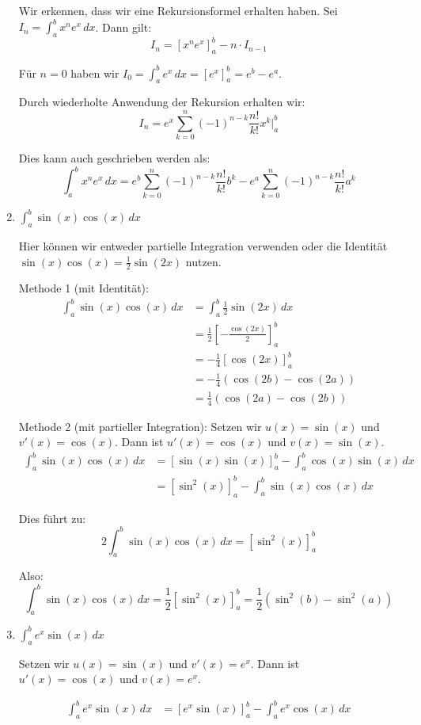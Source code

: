 \documentclass{article}
\begin{document}
\begin{enumerate}[label=(\alph*)]
Wir erkennen, dass wir eine Rekursionsformel erhalten haben. Sei $I_n = \int_a^b x^n e^x\,dx$. Dann gilt:
$$I_n = [x^n e^x]_a^b - n \cdot I_{n-1}$$

Für $n = 0$ haben wir $I_0 = \int_a^b e^x\,dx = [e^x]_a^b = e^b - e^a$.

Durch wiederholte Anwendung der Rekursion erhalten wir:
$$I_n = e^x \sum_{k=0}^{n} (-1)^{n-k} \frac{n!}{k!} x^k \Bigg|_a^b$$

Dies kann auch geschrieben werden als:
$$\int_a^b x^n e^x\,dx = e^b \sum_{k=0}^{n} (-1)^{n-k} \frac{n!}{k!} b^k - e^a \sum_{k=0}^{n} (-1)^{n-k} \frac{n!}{k!} a^k$$

\item $\int_a^b \sin(x)\cos(x)\,dx$

Hier können wir entweder partielle Integration verwenden oder die Identität $\sin(x)\cos(x) = \frac{1}{2}\sin(2x)$ nutzen.

Methode 1 (mit Identität):
\begin{align}
\int_a^b \sin(x)\cos(x)\,dx &= \int_a^b \frac{1}{2}\sin(2x)\,dx\\
&= \frac{1}{2} \left[-\frac{\cos(2x)}{2}\right]_a^b\\
&= -\frac{1}{4}[\cos(2x)]_a^b\\
&= -\frac{1}{4}(\cos(2b) - \cos(2a))\\
&= \frac{1}{4}(\cos(2a) - \cos(2b))
\end{align}

Methode 2 (mit partieller Integration):
Setzen wir $u(x) = \sin(x)$ und $v'(x) = \cos(x)$. Dann ist $u'(x) = \cos(x)$ und $v(x) = \sin(x)$.
\begin{align}
\int_a^b \sin(x)\cos(x)\,dx &= [\sin(x)\sin(x)]_a^b - \int_a^b \cos(x)\sin(x)\,dx\\
&= [\sin^2(x)]_a^b - \int_a^b \sin(x)\cos(x)\,dx
\end{align}

Dies führt zu:
$$2\int_a^b \sin(x)\cos(x)\,dx = [\sin^2(x)]_a^b$$

Also:
$$\int_a^b \sin(x)\cos(x)\,dx = \frac{1}{2}[\sin^2(x)]_a^b = \frac{1}{2}(\sin^2(b) - \sin^2(a))$$

\item $\int_a^b e^x\sin(x)\,dx$

Setzen wir $u(x) = \sin(x)$ und $v'(x) = e^x$. Dann ist $u'(x) = \cos(x)$ und $v(x) = e^x$.

\begin{align}
\int_a^b e^x\sin(x)\,dx &= [e^x\sin(x)]_a^b - \int_a^b e^x\cos(x)\,dx
\end{align}


\end{enumerate}
\end{document}
